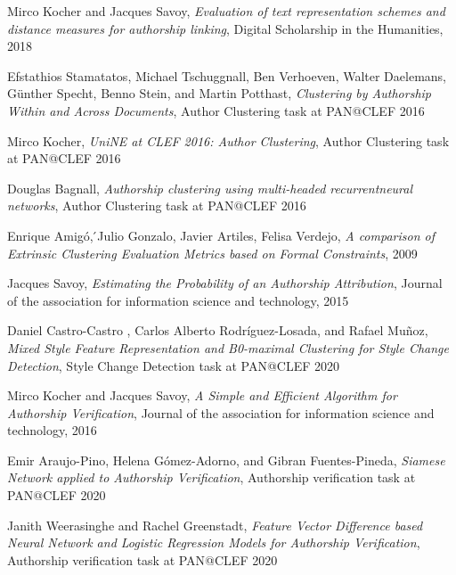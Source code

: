\begin{thebibliography}{9}


Mirco Kocher and Jacques Savoy,
\textit{Evaluation of text representation schemes and distance measures for authorship linking},
Digital Scholarship in the Humanities, 2018

Efstathios Stamatatos, Michael Tschuggnall, Ben Verhoeven, Walter Daelemans, Günther Specht, Benno Stein, and Martin Potthast,
\textit{Clustering by Authorship Within and Across Documents},
Author Clustering task at PAN@CLEF 2016

Mirco Kocher,
\textit{UniNE at CLEF 2016: Author Clustering},
Author Clustering task at PAN@CLEF 2016

Douglas Bagnall,
\textit{Authorship clustering using multi-headed recurrentneural networks},
Author Clustering task at PAN@CLEF 2016


Enrique Amigó, ́Julio Gonzalo, Javier Artiles, Felisa Verdejo,
\textit{A comparison of Extrinsic Clustering Evaluation Metrics based on Formal Constraints},
2009

Jacques Savoy,
\textit{Estimating the Probability of an Authorship Attribution},
Journal of the association for information science and technology, 2015

Daniel Castro-Castro , Carlos Alberto Rodríguez-Losada, and Rafael Muñoz,
\textit{Mixed Style Feature Representation and B0-maximal Clustering for Style Change Detection},
Style Change Detection task at PAN@CLEF 2020

Mirco Kocher and Jacques Savoy,
\textit{A Simple and Efficient Algorithm for Authorship Verification},
Journal of the association for information science and technology, 2016

Emir Araujo-Pino, Helena Gómez-Adorno, and Gibran Fuentes-Pineda,
\textit{Siamese Network applied to Authorship Verification},
Authorship verification task at PAN@CLEF 2020

Janith Weerasinghe and Rachel Greenstadt,
\textit{Feature Vector Difference based Neural Network and Logistic Regression Models for Authorship Verification},
Authorship verification task at PAN@CLEF 2020


\end{thebibliography}
